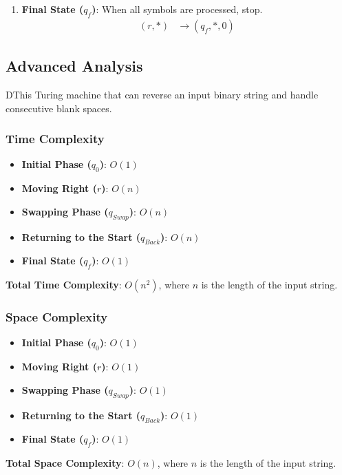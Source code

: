 \documentclass[a4paper]{article}
\begin{document}
\begin{enumerate}
    \item \textbf{Final State (\( q_f \))}: When all symbols are processed, stop.
    \begin{align*}
        (r, *) &\rightarrow (q_f, *, 0)
    \end{align*}
\end{enumerate}

\subsection{Advanced Analysis}
DThis Turing machine that can reverse an input binary string and handle consecutive blank spaces.
\subsubsection{Time Complexity}

\begin{itemize}
    \item \textbf{Initial Phase (\( q_0 \))}: \( O(1) \)
    \item \textbf{Moving Right (\( r \))}: \( O(n) \)
    \item \textbf{Swapping Phase (\( q_{Swap} \))}: \( O(n) \)
    \item \textbf{Returning to the Start (\( q_{Back} \))}: \( O(n) \)
    \item \textbf{Final State (\( q_f \))}: \( O(1) \)
\end{itemize}

\textbf{Total Time Complexity}: \( O(n^2) \), where \( n \) is the length of the input string.

\subsubsection{Space Complexity}

\begin{itemize}
    \item \textbf{Initial Phase (\( q_0 \))}: \( O(1) \)
    \item \textbf{Moving Right (\( r \))}: \( O(1) \)
    \item \textbf{Swapping Phase (\( q_{Swap} \))}: \( O(1) \)
    \item \textbf{Returning to the Start (\( q_{Back} \))}: \( O(1) \)
    \item \textbf{Final State (\( q_f \))}: \( O(1) \)
\end{itemize}

\textbf{Total Space Complexity}: \( O(n) \), where \( n \) is the length of the input string.
\end{document}
